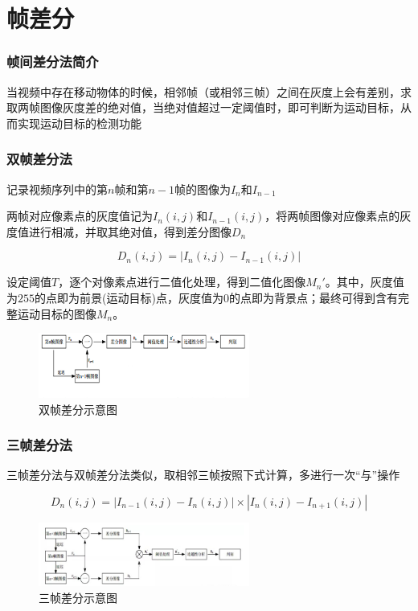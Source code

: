 \section{帧差分}

\begin{frame}
    \frametitle{帧间差分法简介}


    当视频中存在移动物体的时候，相邻帧（或相邻三帧）之间在灰度上会有差别，求取两帧图像灰度差的绝对值，当绝对值超过一定阈值时，即可判断为运动目标，从而实现运动目标的检测功能
\end{frame}


\begin{frame}
    \frametitle{双帧差分法}

    记录视频序列中的第$n$帧和第$n-1$帧的图像为$I_n$和$I_{n-1}$

    两帧对应像素点的灰度值记为$I_n(i,j)$和$I_{n-1}(i,j)$，将两帧图像对应像素点的灰度值进行相减，并取其绝对值，得到差分图像$D_n$

    \begin{equation}
        D_n (i, j) = \left\lvert I_n (i, j) - I_{n - 1} (i, j) \right\rvert
    \end{equation}

    设定阈值$T$，逐个对像素点进行二值化处理，得到二值化图像$M_n'$。其中，灰度值为$255$的点即为前景(运动目标)点，灰度值为$0$的点即为背景点；最终可得到含有完整运动目标的图像$M_n$。

    \begin{figure}
        \centering
        \includegraphics[width=0.618\textwidth]{images/fd_double.png}
        \caption{双帧差分示意图}
    \end{figure}

\end{frame}


\begin{frame}
    \frametitle{三帧差分法}

    三帧差分法与双帧差分法类似，取相邻三帧按照下式计算，多进行一次``与''操作

    \begin{equation}
        D_n (i, j) = \left\lvert I_{n - 1} (i, j) - I_n (i, j) \right\rvert \times \left\lvert I_n(i, j) - I_{n + 1} (i, j) \right\rvert
    \end{equation}
    \begin{figure}
        \centering
        \includegraphics[width=0.618\textwidth]{images/fd_triple.png}
        \caption{三帧差分示意图}
    \end{figure}
\end{frame}


